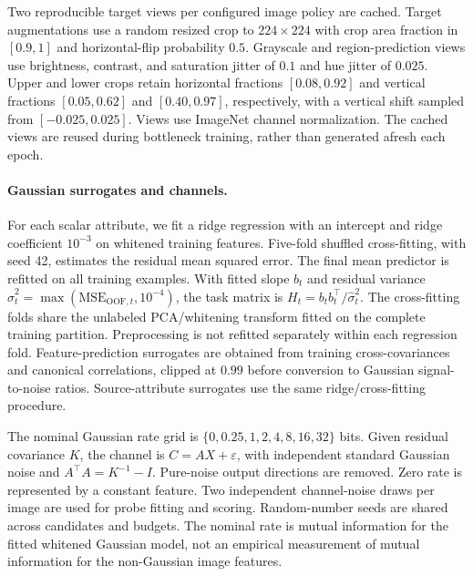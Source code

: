 Two reproducible target views per configured image policy are cached.
Target augmentations use a random resized crop to $224\times224$ with crop
area fraction in $[0.9,1]$ and horizontal-flip probability $0.5$.
Grayscale and region-prediction views use brightness, contrast, and saturation
jitter of $0.1$ and hue jitter of $0.025$. Upper and lower crops retain
horizontal fractions $[0.08,0.92]$ and vertical fractions $[0.05,0.62]$ and
$[0.40,0.97]$, respectively, with a vertical shift sampled from
$[-0.025,0.025]$. Views use ImageNet channel normalization. The cached views
are reused during bottleneck training, rather than generated afresh each epoch.

\paragraph{Gaussian surrogates and channels.}
For each scalar attribute, we fit a ridge regression with an intercept and
ridge coefficient $10^{-3}$ on whitened training features. Five-fold shuffled
cross-fitting, with seed 42, estimates the residual mean squared error.
The final mean predictor is refitted on all training examples. With fitted
slope $b_t$ and residual variance
$\hat\sigma_t^2=\max(\mathrm{MSE}_{\mathrm{OOF},t},10^{-4})$, the task matrix is
$H_t=b_tb_t^\top/\hat\sigma_t^2$. The cross-fitting folds share the unlabeled
PCA/whitening transform fitted on the complete training partition. Preprocessing
is not refitted separately within each regression fold. Feature-prediction
surrogates are obtained from training cross-covariances and canonical
correlations, clipped at $0.99$ before conversion to Gaussian signal-to-noise
ratios. Source-attribute surrogates use the same ridge/cross-fitting procedure.

The nominal Gaussian rate grid is
$\{0,0.25,1,2,4,8,16,32\}$ bits. Given residual covariance $K$, the channel
is $C=AX+\varepsilon$, with independent standard Gaussian noise and
$A^\top A=K^{-1}-I$. Pure-noise output directions are removed. Zero rate
is represented by a constant feature. Two independent channel-noise draws
per image are used for probe fitting and scoring. Random-number seeds are
shared across candidates and budgets. The nominal rate is mutual information
for the fitted whitened Gaussian model, not an empirical measurement of
mutual information for the non-Gaussian image features.

